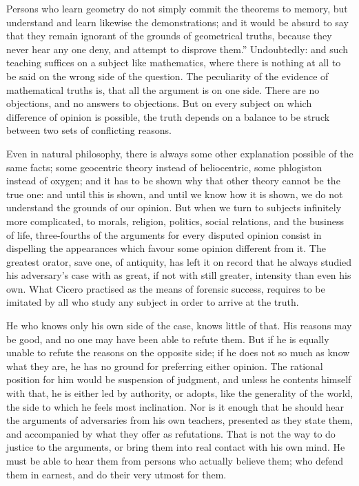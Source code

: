 Persons who learn geometry do not simply commit the theorems to memory, but understand and learn likewise the demonstrations; and it would be absurd to say that they remain ignorant of the grounds of geometrical truths, because they never hear any one deny, and attempt to disprove them.” Undoubtedly: and such teaching suffices on a subject like mathematics, where there is nothing at all to be said on the wrong side of the question. The peculiarity of the evidence of mathematical truths is, that all the argument is on one side. There are no objections, and no answers to objections. But on every subject on which difference of opinion is possible, the truth depends on a balance to be struck between two sets of conflicting reasons.\par

Even in natural philosophy, there is always some other explanation possible of the same facts; some geocentric theory instead of heliocentric, some phlogiston instead of oxygen; and it has to be shown why that other theory cannot be the true one: and until this is shown, and until we know how it is shown, we do not understand the grounds of our opinion. But when we turn to subjects infinitely more complicated, to morals, religion, politics, social relations, and the business of life, three-fourths of the arguments for every disputed opinion consist in dispelling the appearances which favour some opinion different from it. The greatest orator, save one, of antiquity, has left it on record that he always studied his adversary’s case with as great, if not with still greater, intensity than even his own. What Cicero practised as the means of forensic success, requires to be imitated by all who study any subject in order to arrive at the truth.\par

He who knows only his own side of the case, knows little of that. His reasons may be good, and no one may have been able to refute them. But if he is equally unable to refute the reasons on the opposite side; if he does not so much as know what they are, he has no ground for preferring either opinion. The rational position for him would be suspension of judgment, and unless he contents himself with that, he is either led by authority, or adopts, like the generality of the world, the side to which he feels most inclination. Nor is it enough that he should hear the arguments of adversaries from his own teachers, presented as they state them, and accompanied by what they offer as refutations. That is not the way to do justice to the arguments, or bring them into real contact with his own mind. He must be able to hear them from persons who actually believe them; who defend them in earnest, and do their very utmost for them.\par

